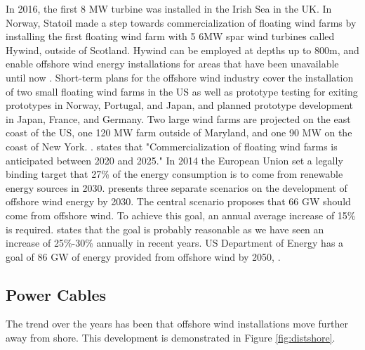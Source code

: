  \noindent In 2016, the first 8 MW turbine was installed in the Irish Sea in the UK. In Norway, Statoil made a step towards commercialization of floating wind farms by installing the first floating wind farm with 5 6MW spar wind turbines called Hywind, outside of Scotland. Hywind can be employed at depths up to 800m, and enable offshore wind energy installations for areas that have been unavailable until now \cite{Equinor2018}. Short-term plans for the offshore wind industry cover the installation of two small floating wind farms in the US as well as prototype testing for exiting prototypes in Norway, Portugal, and Japan, and planned prototype development in Japan, France, and Germany.  Two large wind farms are projected on the east coast of the US, one 120 MW farm outside of Maryland, and one 90 MW on the coast of New York. \cite{Gao2018}. \newline
 \newline
 \cite{Bailey2014} states that "Commercialization of floating wind farms is
anticipated between 2020 and 2025." In 2014 the European Union set a legally binding target that 27\% of the energy consumption is to come from renewable energy sources in 2030. \cite{EWEA2015}  presents three separate scenarios on the development of offshore wind energy by 2030. The central scenario proposes that 66 GW  should come from offshore wind. To achieve this goal, an annual average increase of 15\% is required. \cite{Gao2018} states that the goal is probably reasonable as we have seen an increase of 25\%-30\% annually in recent years. US Department of Energy has a goal of 86 GW of energy provided from offshore wind by 2050, \cite{windus2016}. 
\subsection{Power Cables}
The trend over the years has been that offshore wind installations move further away from shore. This development is demonstrated in Figure \ref{fig:distshore}. 

